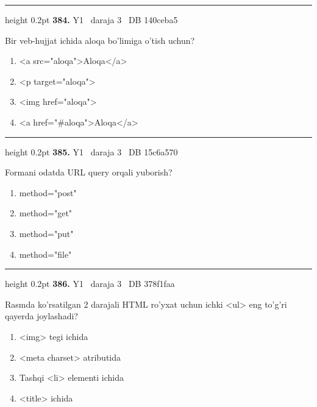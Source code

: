 \documentclass[10pt,a4paper,oneside]{article}
\begin{document}
\vspace{2mm}\hrule height 0.2pt \vspace{4mm}
\hypertarget{q384}{\textbf{\color{ink}384.}}  {\color{muted}\scriptsize Y1 \textbullet\ daraja 3 \textbullet\ DB 140ceba5}
\par
Bir veb-hujjat ichida aloqa bo'limiga o'tish uchun?
\begin{enumerate}[label=\Alph*),leftmargin=9mm]
\item \textless{}a src="aloqa"\textgreater{}Aloqa\textless{}/a\textgreater{}
\item \textless{}p target="aloqa"\textgreater{}
\item \textless{}img href="aloqa"\textgreater{}
\item \textless{}a href="\#aloqa"\textgreater{}Aloqa\textless{}/a\textgreater{}
\end{enumerate}
\vspace{2mm}\hrule height 0.2pt \vspace{4mm}
\hypertarget{q385}{\textbf{\color{ink}385.}}  {\color{muted}\scriptsize Y1 \textbullet\ daraja 3 \textbullet\ DB 15c6a570}
\par
Formani odatda URL query orqali yuborish?
\begin{enumerate}[label=\Alph*),leftmargin=9mm]
\item method="post"
\item method="get"
\item method="put"
\item method="file"
\end{enumerate}
\vspace{2mm}\hrule height 0.2pt \vspace{4mm}
\hypertarget{q386}{\textbf{\color{ink}386.}}  {\color{muted}\scriptsize Y1 \textbullet\ daraja 3 \textbullet\ DB 378f1faa}
\par
Rasmda ko'rsatilgan 2 darajali HTML ro'yxat uchun ichki \textless{}ul\textgreater{} eng to'g'ri qayerda joylashadi?
\begin{enumerate}[label=\Alph*),leftmargin=9mm]
\item \textless{}img\textgreater{} tegi ichida
\item \textless{}meta charset\textgreater{} atributida
\item Tashqi \textless{}li\textgreater{} elementi ichida
\item \textless{}title\textgreater{} ichida
\end{enumerate}
\end{document}
